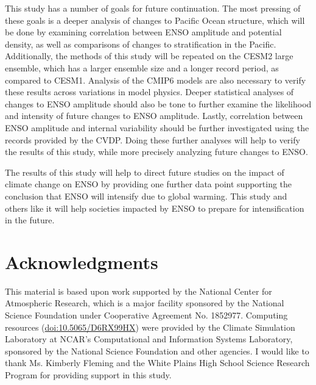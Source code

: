 \documentclass[11pt]{article}
\begin{document}
This study has a number of goals for future continuation. The most pressing of these goals is a deeper analysis of changes to Pacific Ocean structure, which will be done by examining correlation between ENSO amplitude and potential density, as well as comparisons of changes to stratification in the Pacific. Additionally, the methods of this study will be repeated on the CESM2 large ensemble, which has a larger ensemble size and a longer record period, as compared to CESM1. Analysis of the CMIP6 models are also necessary to verify these results across variations in model physics. Deeper statistical analyses of changes to ENSO amplitude should also be tone to further examine the likelihood and intensity of future changes to ENSO amplitude. Lastly, correlation between ENSO amplitude and internal variability should be further investigated using the records provided by the CVDP. Doing these further analyses will help to verify the results of this study, while more precisely analyzing future changes to ENSO.

The results of this study will help to direct future studies on the impact of climate change on ENSO by providing one further data point supporting the conclusion that ENSO will intensify due to global warming. This study and others like it will help societies impacted by ENSO to prepare for intensification in the future.

\section{Acknowledgments}

This material is based upon work supported by the National Center for Atmospheric Research, which is a major facility sponsored by the National Science Foundation under Cooperative Agreement No. 1852977. Computing resources (\href{https://doi.org/10.5065/D6RX99HX}{doi:10.5065/D6RX99HX}) were provided by the Climate Simulation Laboratory at NCAR's Computational and Information Systems Laboratory, sponsored by the National Science Foundation and other agencies. I would like to thank Ms. Kimberly Fleming and the White Plains High School Science Research Program for providing support in this study.




\end{document}
